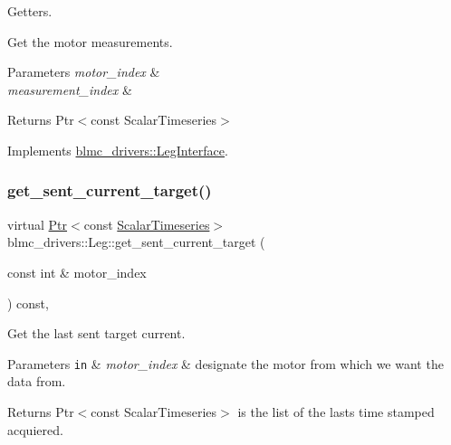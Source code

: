 Getters. 

Get the motor measurements.


\begin{DoxyParams}{Parameters}
{\em motor\+\_\+index} & \\
\hline
{\em measurement\+\_\+index} & \\
\hline
\end{DoxyParams}
\begin{DoxyReturn}{Returns}
Ptr$<$const Scalar\+Timeseries$>$ 
\end{DoxyReturn}


Implements \hyperlink{classblmc__drivers_1_1LegInterface_ae653c7ee0ab7aa9d16a6bfce01580200}{blmc\+\_\+drivers\+::\+Leg\+Interface}.

\mbox{\label{classblmc__drivers_1_1Leg_a94760dbfc66ba22e68dfa8d89eec4c9f}} 
\subsubsection{\texorpdfstring{get\+\_\+sent\+\_\+current\+\_\+target()}{get\_sent\_current\_target()}}
{\footnotesize\ttfamily virtual \hyperlink{classblmc__drivers_1_1LegInterface_ac5af9e6514abff5ee918813925a8e42d}{Ptr}$<$const \hyperlink{classblmc__drivers_1_1LegInterface_a57a35b64a76fb4225637828d1b1c35a6}{Scalar\+Timeseries}$>$ blmc\+\_\+drivers\+::\+Leg\+::get\+\_\+sent\+\_\+current\+\_\+target (\begin{DoxyParamCaption}\item[{const int \&}]{motor\+\_\+index }\end{DoxyParamCaption}) const\hspace{0.3cm}{\ttfamily [inline]}, {\ttfamily [virtual]}}



Get the last sent target current. 


\begin{DoxyParams}[1]{Parameters}
\mbox{\tt in}  & {\em motor\+\_\+index} & designate the motor from which we want the data from. \\
\hline
\end{DoxyParams}
\begin{DoxyReturn}{Returns}
Ptr$<$const Scalar\+Timeseries$>$ is the list of the lasts time stamped acquiered. 
\end{DoxyReturn}


